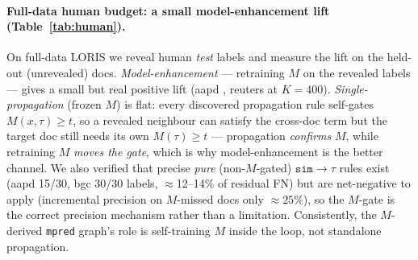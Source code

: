 \documentclass[11pt]{article}
\begin{document}
\paragraph{Full-data human budget: a small model-enhancement lift (Table~\ref{tab:human}).} On full-data
LORIS we reveal human \emph{test} labels and measure the lift on the held-out (unrevealed) docs.
\emph{Model-enhancement} --- retraining $M$ on the revealed labels --- gives a small but real positive
lift (aapd , reuters  at $K{=}400$). \emph{Single-propagation} (frozen $M$)
is flat: every discovered propagation rule self-gates $M(x,\tau)\!\ge\!t$, so a revealed neighbour can
satisfy the cross-doc term but the target doc still needs its own $M(\tau)\!\ge\!t$ --- propagation
\emph{confirms} $M$, while retraining $M$ \emph{moves the gate}, which is why model-enhancement is the
better channel. We also verified that precise \emph{pure} (non-$M$-gated) $\texttt{sim}\to\tau$ rules
exist (aapd 15/30, bgc 30/30 labels, $\approx$12--14\% of residual FN) but are net-negative to apply
(incremental precision on $M$-missed docs only ${\approx}25\%$), so the $M$-gate is the correct precision
mechanism rather than a limitation. Consistently, the $M$-derived \texttt{mpred} graph's role is
self-training $M$ inside the loop, not standalone propagation.
\end{document}
